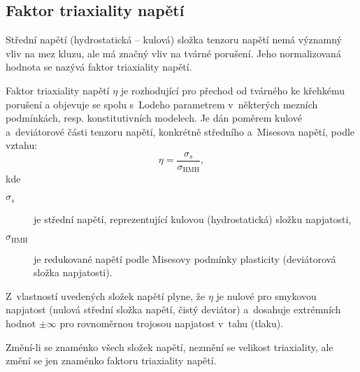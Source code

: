 
\subsection{Faktor triaxiality napětí}
Střední napětí (hydrostatická -- kulová) složka tenzoru napětí nemá významný vliv na mez kluzu, ale má značný vliv na tvárné porušení. Jeho normalizovaná hodnota se nazývá faktor triaxiality napětí.

Faktor triaxiality napětí $\eta$ je rozhodující pro přechod od tvárného ke křehkému porušení a objevuje se spolu s~Lodeho parametrem v~některých mezních podmínkách, resp. konstitutivních modelech. Je dán poměrem kulové a~deviátorové části tenzoru napětí, konkrétně středního a~Misesova napětí, podle vztahu:
\begin{equation}
	\eta = \frac{\sigma_s}{\sigma_\text{HMH}},
\end{equation}
kde
\begin{description}
	\item[$\sigma_s$] je střední napětí, reprezentující kulovou (hydrostatická) složku napjatosti,
	\item[$\sigma_\text{HMH}$] je redukované napětí podle Misesovy podmínky plasticity (deviátorová složka napjatosti).
\end{description}

Z~vlastností uvedených složek napětí plyne, že $\eta$ je nulové pro smykovou napjatost (nulová střední složka napětí, čistý deviátor) a~dosahuje extrémních hodnot $\pm\infty$ pro rovnoměrnou trojosou napjatost v~tahu (tlaku). 

Změní-li se znaménko všech složek napětí, nezmění se velikost triaxiality, ale změní se jen znaménko faktoru triaxiality napětí.


